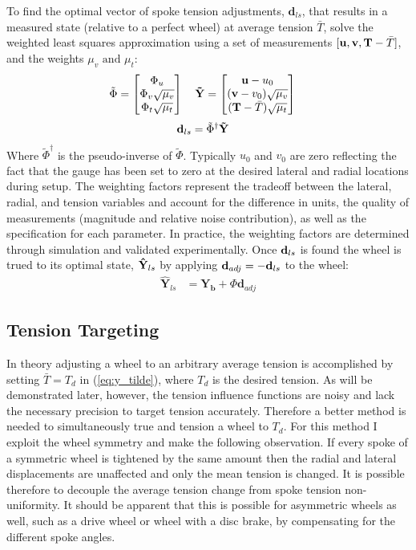 \documentclass[journal]{IEEEtran}
\begin{document}
To find the optimal vector of spoke tension adjustments, $\mathbf{d}_{ls}$, that results in a measured state (relative to a perfect wheel) at average tension $\bar T$, solve the weighted least squares approximation using a set of measurements $ [ {\bf u,v,T}-\bar T ]$, and the weights $\mu_v \text{ and }\mu_t$:
\begin{align}
    \tilde \Phi &= \begin{bmatrix}
    \Phi_u\\
    \Phi_v \sqrt {\mu_v}\\
    \Phi_t \sqrt {\mu_t}
    \end{bmatrix} \quad
    \bf \tilde Y = \begin{bmatrix}
    \mathbf {u} - u_0 \\
   (\mathbf {v}- v_0)  \sqrt {\mu_v}\\
    ( {\bf  T} - \bar T )  \sqrt {\mu_t}
    \end{bmatrix} 
    \label{eq:y_tilde}
\end{align}
\begin{align}
        {\bf d}_{ls} &= \tilde \Phi^\dagger {\bf \tilde Y}
        \label{eq:dls}
\end{align}
Where $\tilde \Phi^\dagger$ is the pseudo-inverse of $\tilde \Phi$.  Typically $u_0$ and $v_0$ are zero reflecting the fact that the gauge has been set to zero at the desired lateral and radial locations during setup. The weighting factors represent the tradeoff between the lateral, radial, and tension variables and account for the difference in units, the quality of measurements (magnitude and relative noise contribution), as well as the specification for each parameter. In practice, the weighting factors are determined through simulation and validated experimentally. Once ${\bf d}_{ls}$ is found the wheel is trued to its optimal state, ${\bf \hat Y}_{ls}$ by applying $\mathbf{d}_{adj} = -{\bf d}_{ls}$ to the wheel:
\begin{align}
\mathbf{\hat Y}_{ls} &= \mathbf{Y_b} + \Phi  \mathbf{d} _{adj}
\label{eq:Yls}
\end{align}

\subsection{Tension Targeting}
In theory adjusting a wheel to an arbitrary average tension is accomplished by setting $\bar T = T_d$ in (\ref{eq:y_tilde}), where $T_d$ is the desired tension. As will be demonstrated later, however, the tension influence functions are noisy and lack the necessary precision to target tension accurately. Therefore a better method is needed to simultaneously true and tension a wheel to $T_d$.  For this method I exploit the wheel symmetry and make the following observation.  If every spoke of a symmetric wheel is tightened by the same amount then the radial and lateral displacements are unaffected and only the mean tension is changed. It is possible therefore to decouple the average tension change from spoke tension non-uniformity. It should be apparent that this is possible for asymmetric wheels as well, such as a drive wheel or wheel with a disc brake, by compensating for the different spoke angles. 
\end{document}
